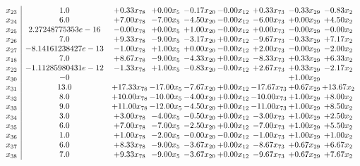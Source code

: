 \documentclass[8pt]{article}
\begin{document}
\[\begin{array}{c| c c@{\hskip 2pt} c@{\hskip 2pt} c@{\hskip 2pt} c@{\hskip 2pt} c@{\hskip 2pt} c@{\hskip 2pt} c@{\hskip 2pt} }
 x_{23}   &  1.0 & +  0.33 x_{78} & +  0.00 x_{5} & -0.17 x_{20} & -0.00 x_{12} & +  0.33 x_{73} & -0.33 x_{29} & -0.83 x_{2}\\
 x_{24}   &  6.0 & +  7.00 x_{78} & -7.00 x_{5} & -4.50 x_{20} & -0.00 x_{12} & -6.00 x_{73} & +  0.00 x_{29} & +  4.50 x_{2}\\
 x_{25}   &  2.27248775353e-16 & -0.00 x_{78} & +  0.00 x_{5} & +  1.00 x_{20} & -0.00 x_{12} & +  0.00 x_{73} & -0.00 x_{29} & -0.00 x_{2}\\
 x_{26}   &  7.0 & +  9.33 x_{78} & -9.00 x_{5} & -3.17 x_{20} & +  0.00 x_{12} & -9.67 x_{73} & -0.33 x_{29} & +  7.17 x_{2}\\
 x_{27}   &  -8.14161238427e-13 & -1.00 x_{78} & +  1.00 x_{5} & +  0.00 x_{20} & -0.00 x_{12} & +  2.00 x_{73} & -0.00 x_{29} & -2.00 x_{2}\\
 x_{18}   &  7.0 & +  8.67 x_{78} & -9.00 x_{5} & -4.33 x_{20} & +  0.00 x_{12} & -8.33 x_{73} & +  0.33 x_{29} & +  6.33 x_{2}\\
 x_{22}   &  -1.11285980431e-12 & -1.33 x_{78} & +  1.00 x_{5} & -0.83 x_{20} & -0.00 x_{12} & +  2.67 x_{73} & +  0.33 x_{29} & -2.17 x_{2}\\
 x_{30}   &  -0  &    &    &    &    &   & +  1.00 x_{29} &   \\
 x_{31}   &  13.0 & + 17.33 x_{78} & -17.00 x_{5} & -7.67 x_{20} & +  0.00 x_{12} & -17.67 x_{73} & +  0.67 x_{29} & + 13.67 x_{2}\\
 x_{32}   &  8.0 & + 10.00 x_{78} & -10.00 x_{5} & -4.00 x_{20} & +  0.00 x_{12} & -10.00 x_{73} & +  1.00 x_{29} & +  8.00 x_{2}\\
 x_{33}   &  9.0 & + 11.00 x_{78} & -12.00 x_{5} & -4.50 x_{20} & +  0.00 x_{12} & -11.00 x_{73} & +  1.00 x_{29} & +  8.50 x_{2}\\
 x_{34}   &  3.0 & +  3.00 x_{78} & -4.00 x_{5} & -0.50 x_{20} & +  0.00 x_{12} & -3.00 x_{73} & +  1.00 x_{29} & +  2.50 x_{2}\\
 x_{35}   &  6.0 & +  7.00 x_{78} & -7.00 x_{5} & -2.50 x_{20} & +  0.00 x_{12} & -7.00 x_{73} & +  1.00 x_{29} & +  5.50 x_{2}\\
 x_{36}   &  1.0 & +  1.00 x_{78} & -2.00 x_{5} & -0.00 x_{20} & -0.00 x_{12} & -1.00 x_{73} & +  1.00 x_{29} & +  1.00 x_{2}\\
 x_{37}   &  6.0 & +  8.33 x_{78} & -9.00 x_{5} & -3.67 x_{20} & +  0.00 x_{12} & -8.67 x_{73} & +  0.67 x_{29} & +  6.67 x_{2}\\
 x_{38}   &  7.0 & +  9.33 x_{78} & -9.00 x_{5} & -3.67 x_{20} & +  0.00 x_{12} & -9.67 x_{73} & +  0.67 x_{29} & +  7.67 x_{2}\\

\end{array}\]
\end{document}
